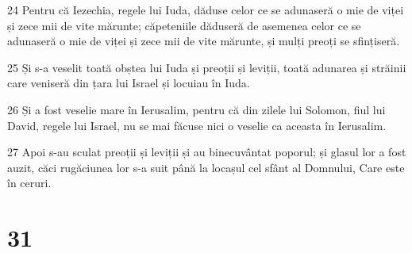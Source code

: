 \par 24 Pentru că Iezechia, regele lui Iuda, dăduse celor ce se adunaseră o mie de viței și zece mii de vite mărunte; căpeteniile dăduseră de asemenea celor ce se adunaseră o mie de viței și zece mii de vite mărunte, și mulți preoți se sfințiseră.
\par 25 Și s-a veselit toată obștea lui Iuda și preoții și leviții, toată adunarea și străinii care veniseră din țara lui Israel și locuiau în Iuda.
\par 26 Și a fost veselie mare în Ierusalim, pentru că din zilele lui Solomon, fiul lui David, regele lui Israel, nu se mai făcuse nici o veselie ca aceasta în Ierusalim.
\par 27 Apoi s-au sculat preoții și leviții și au binecuvântat poporul; și glasul lor a fost auzit, căci rugăciunea lor s-a suit până la locașul cel sfânt al Domnului, Care este în ceruri.

\chapter{31}

